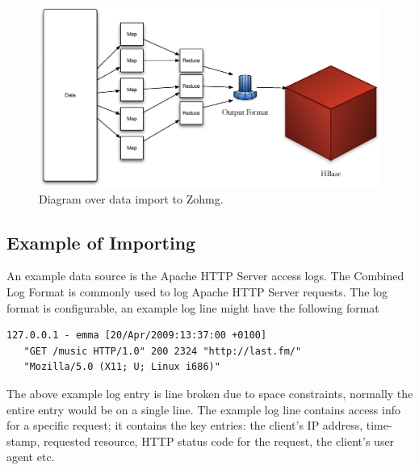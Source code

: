 \begin{figure}[h]
    \begin{center}
        \includegraphics[scale=0.40]{zohmg-import.eps}
        \caption{Diagram over data import to Zohmg.}
    \end{center}
\end{figure}



\subsection*{Example of Importing}


An example data source is the Apache HTTP Server access logs. The Combined Log
Format is commonly used to log Apache HTTP Server requests. The log format is
configurable, an example log line might have the following format

\vspace{12pt}

\begin{lstlisting}[caption=Example log line entry for the Apache HTTP Server's
Combined Log Format.,captionpos=b]
   127.0.0.1 - emma [20/Apr/2009:13:37:00 +0100]
   "GET /music HTTP/1.0" 200 2324 "http://last.fm/"
   "Mozilla/5.0 (X11; U; Linux i686)"
\end{lstlisting}

\vspace{12pt}

The above example log entry is line broken due to space constraints, normally
the entire entry would be on a single line. The example log line contains access
info for a specific request; it contains the key entries: the client's IP
address, time-stamp, requested resource, HTTP status code for the request, the
client's user agent etc.

